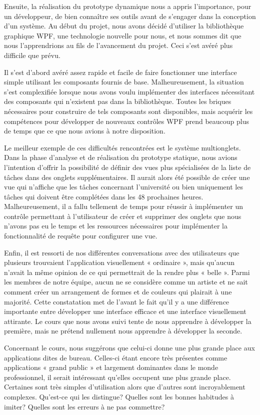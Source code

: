 \documentclass[letterpaper, oneside, 12pt, these, creativecommons]{thETS}
\begin{document}
Ensuite, la réalisation du prototype dynamique nous a appris l'importance, pour un développeur, de bien connaître ses outils avant de s'engager dans la conception d'un système. Au début du projet, nous avons décidé d'utiliser la bibliothèque graphique WPF, une technologie nouvelle pour nous, et nous sommes dit que nous l'apprendrions au fils de l'avancement du projet. Ceci s'est avéré plus difficile que prévu.

Il s'est d'abord avéré assez rapide et facile de faire fonctionner une interface simple utilisant les composants fournis de base. Malheureusement, la situation s'est complexifiée lorsque nous avons voulu implémenter des interfaces nécessitant des composants qui n'existent pas dans la bibliothèque. Toutes les briques nécessaires pour construire de tels composants sont disponibles, mais acquérir les compétences pour développer de nouveaux contrôles WPF prend beaucoup plus de temps que ce que nous avions à notre disposition.

Le meilleur exemple de ces difficultés rencontrées est le système multionglets. Dans la phase d'analyse et de réalisation du prototype statique, nous avions l'intention d'offrir la possibilité de définir des vues plus spécialisées de la liste de tâches dans des onglets supplémentaires. Il aurait alors été possible de créer une vue qui n'affiche que les tâches concernant l'université ou bien uniquement les tâches qui doivent être complétées dans les 48 prochaines heures. Malheureusement, il a fallu tellement de temps pour réussir à implémenter un contrôle permettant à l'utilisateur de créer et supprimer des onglets que nous n'avons pas eu le temps et les ressources nécessaires pour implémenter la fonctionnalité de requête pour configurer une vue.

Enfin, il est ressorti de nos différentes conversations avec des utilisateurs que plusieurs trouvaient l'application visuellement « ordinaire », mais qu'aucun n'avait la même opinion de ce qui permettrait de la rendre plus « belle ». Parmi les membres de notre équipe, aucun ne se considère comme un artiste et ne sait comment créer un arrangement de formes et de couleurs qui plairait à une majorité. Cette constatation met de l'avant le fait qu'il y a une différence importante entre développer une interface efficace et une interface visuellement attirante. Le cours que nous avons suivi tente de nous apprendre à développer la première, mais ne prétend nullement nous apprendre à développer la seconde.

Concernant le cours, nous suggérons que celui-ci donne une plus grande place aux applications dites de bureau. Celles-ci étant encore très présentes comme applications « grand public » et largement dominantes dans le monde professionnel, il serait intéressant qu'elles occupent une plus grande place. Certaines sont très simples d'utilisation alors que d'autres sont incroyablement complexes. Qu'est-ce qui les distingue? Quelles sont les bonnes habitudes à imiter? Quelles sont les erreurs à ne pas commettre?
\end{document}
